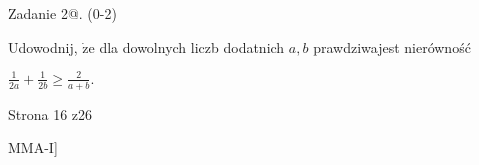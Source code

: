 \documentclass[a4paper,12pt]{article}
\begin{document}
Zadanie 2@. (0-2)

Udowodnij, $\dot{\mathrm{z}}\mathrm{e}$ dla dowolnych liczb dodatnich $a, b$ prawdziwajest nierówność

$\displaystyle \frac{1}{2a}+\frac{1}{2b}\geq\frac{2}{a+b}.$

Strona 16 z26

MMA-I]
\end{document}
